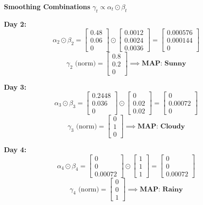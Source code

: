\documentclass{article}
\begin{document}
\begin{enumerate}
    \vspace{1em}
    \textbf{Smoothing Combinations} \quad $\gamma_t \propto \alpha_t \odot \beta_t$

    \textbf{Day 2:}
    $$ \alpha_2 \odot \beta_2 = \begin{bmatrix} 0.48 \\ 0.06 \\ 0 \end{bmatrix} \odot \begin{bmatrix} 0.0012 \\ 0.0024 \\ 0.0036 \end{bmatrix} = \begin{bmatrix} 0.000576 \\ 0.000144 \\ 0 \end{bmatrix} $$
    $$ \gamma_2 \text{ (norm)} = \begin{bmatrix} 0.8 \\ 0.2 \\ 0 \end{bmatrix} \implies \textbf{MAP: Sunny} $$

    \textbf{Day 3:}
    $$ \alpha_3 \odot \beta_3 = \begin{bmatrix} 0.2448 \\ 0.036 \\ 0 \end{bmatrix} \odot \begin{bmatrix} 0 \\ 0.02 \\ 0.02 \end{bmatrix} = \begin{bmatrix} 0 \\ 0.00072 \\ 0 \end{bmatrix} $$
    $$ \gamma_3 \text{ (norm)} = \begin{bmatrix} 0 \\ 1 \\ 0 \end{bmatrix} \implies \textbf{MAP: Cloudy} $$

    \textbf{Day 4:}
    $$ \alpha_4 \odot \beta_4 = \begin{bmatrix} 0 \\ 0 \\ 0.00072 \end{bmatrix} \odot \begin{bmatrix} 1 \\ 1 \\ 1 \end{bmatrix} = \begin{bmatrix} 0 \\ 0 \\ 0.00072 \end{bmatrix} $$
    $$ \gamma_4 \text{ (norm)} = \begin{bmatrix} 0 \\ 0 \\ 1 \end{bmatrix} \implies \textbf{MAP: Rainy} $$


\end{enumerate}
\end{document}
